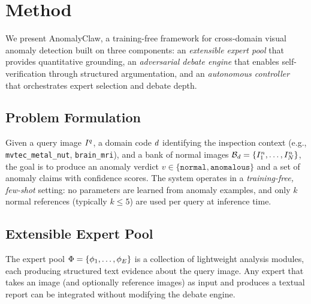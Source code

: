 \section{Method}
\label{sec:method}

We present AnomalyClaw, a training-free framework for cross-domain visual anomaly detection built on three components: an \emph{extensible expert pool} that provides quantitative grounding, an \emph{adversarial debate engine} that enables self-verification through structured argumentation, and an \emph{autonomous controller} that orchestrates expert selection and debate depth.

\subsection{Problem Formulation}
\label{sec:formulation}

Given a query image $I^q$, a domain code $d$ identifying the inspection context (e.g., \texttt{mvtec\_metal\_nut}, \texttt{brain\_mri}), and a bank of normal images $\mathcal{B}_d = \{I^n_1, \ldots, I^n_N\}$, the goal is to produce an anomaly verdict $v \in \{\texttt{normal}, \texttt{anomalous}\}$ and a set of anomaly claims with confidence scores.
The system operates in a \emph{training-free, few-shot} setting: no parameters are learned from anomaly examples, and only $k$ normal references (typically $k \leq 5$) are used per query at inference time.

\subsection{Extensible Expert Pool}
\label{sec:experts}

The expert pool $\Phi = \{\phi_1, \ldots, \phi_E\}$ is a collection of lightweight analysis modules, each producing structured text evidence about the query image.
Any expert that takes an image (and optionally reference images) as input and produces a textual report can be integrated without modifying the debate engine.

